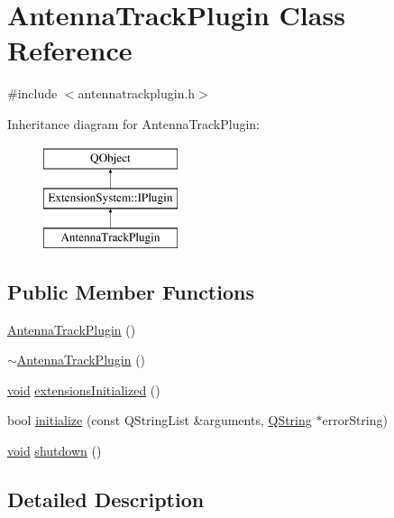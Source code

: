 \hypertarget{class_antenna_track_plugin}{\section{Antenna\-Track\-Plugin Class Reference}
\label{class_antenna_track_plugin}
}


{\ttfamily \#include $<$antennatrackplugin.\-h$>$}

Inheritance diagram for Antenna\-Track\-Plugin\-:\begin{figure}[H]
\begin{center}
\leavevmode
\includegraphics[height=3.000000cm]{class_antenna_track_plugin}
\end{center}
\end{figure}
\subsection*{Public Member Functions}
\begin{DoxyCompactItemize}
\item 
\hyperlink{class_antenna_track_plugin_ab54dcdb214e3f2d6a4399308605864b1}{Antenna\-Track\-Plugin} ()
\item 
\hyperlink{class_antenna_track_plugin_addd54210e941b2d9fa6106c351f72f97}{$\sim$\-Antenna\-Track\-Plugin} ()
\item 
\hyperlink{group___u_a_v_objects_plugin_ga444cf2ff3f0ecbe028adce838d373f5c}{void} \hyperlink{class_antenna_track_plugin_a370afea2fcc519ae07e072bf227f096c}{extensions\-Initialized} ()
\item 
bool \hyperlink{class_antenna_track_plugin_a8bcbdaaf5cd20fa3a61f6c7bd9b5d514}{initialize} (const Q\-String\-List \&arguments, \hyperlink{group___u_a_v_objects_plugin_gab9d252f49c333c94a72f97ce3105a32d}{Q\-String} $\ast$error\-String)
\item 
\hyperlink{group___u_a_v_objects_plugin_ga444cf2ff3f0ecbe028adce838d373f5c}{void} \hyperlink{class_antenna_track_plugin_a3628ddddb3154268c34dfd1f69c6e8f4}{shutdown} ()
\end{DoxyCompactItemize}


\subsection{Detailed Description}


